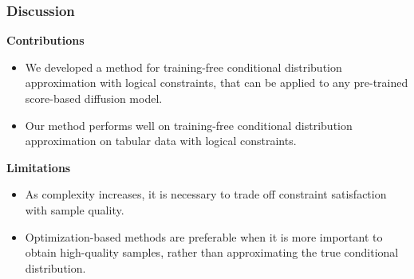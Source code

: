 








\begin{frame} %
\frametitle{Discussion}

\textbf{Contributions}
\begin{itemize}
    \item We developed a method for training-free conditional distribution approximation with logical constraints, that can be applied to any pre-trained score-based diffusion model.
    \item Our method performs well on training-free conditional distribution approximation on tabular data with logical constraints.
\end{itemize}

\textbf{Limitations}
\begin{itemize}
    \item As complexity increases, it is necessary to trade off constraint satisfaction with sample quality.

    \item Optimization-based methods are preferable when it is more important to obtain high-quality samples, rather than approximating the true conditional distribution.
    
\end{itemize}

\end{frame} %
